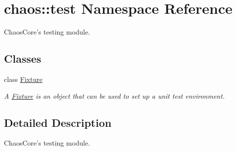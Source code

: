 \hypertarget{namespacechaos_1_1test}{\section{chaos\-:\-:test Namespace Reference}
\label{namespacechaos_1_1test}
}


Chaos\-Core's testing module.  


\subsection*{Classes}
\begin{DoxyCompactItemize}
\item 
class \hyperlink{classchaos_1_1test_1_1_fixture}{Fixture}
\begin{DoxyCompactList}\small\item\em A \hyperlink{classchaos_1_1test_1_1_fixture}{Fixture} is an object that can be used to set up a unit test environment. \end{DoxyCompactList}\end{DoxyCompactItemize}


\subsection{Detailed Description}
Chaos\-Core's testing module. 